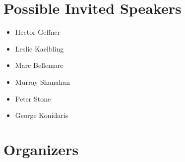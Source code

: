 \documentclass[10pt]{article}
\begin{document}
\section*{Possible Invited Speakers}

\begin{itemize}
  \item Hector Geffner
  \item Leslie Kaelbling
  \item Marc Bellemare
  \item Murray Shanahan
  \item Peter Stone 
  \item George Konidaris
\end{itemize}


\section*{Organizers}

\end{document}
